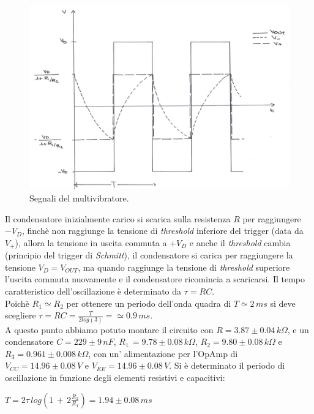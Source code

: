 \documentclass[10pt,a4paper]{article}
\begin{document}
\begin{figure}[htb!]
\centering
\includegraphics[scale=.5]{immagini/ondeSovrapposte.jpg}
\caption{Segnali del multivibratore.}
\label{funzionamento}
\end{figure}

Il condensatore inizialmente carico si scarica sulla resistenza $R$ per raggiungere $-V_D$, finchè non raggiunge la tensione di \emph{threshold} inferiore del trigger (data da $V_{+}$), allora la tensione in uscita commuta a $+V_{D}$ e anche il \emph{threshold} cambia (principio del trigger di \emph{Schmitt}), il condensatore si carica per raggiungere la tensione $V_D = V_{OUT}$, ma quando raggiunge la tensione di \emph{threshold} superiore l'uscita commuta nuovamente e il condensatore ricomincia a scaricarsi. Il tempo caratteristico dell'oscillazione è determinato da $\tau = RC$.\\


Poichè $R_1 \simeq R_2$ per ottenere un periodo dell'onda quadra di $T \simeq 2 \, ms$ si deve scegliere $\tau = RC = \frac{T}{2 log(3)} = \simeq 0.9\,ms$.\\
A questo punto abbiamo potuto montare il circuito con $R = 3.87 \pm 0.04 \, k\Omega$, e un condensatore $C = 229 \pm 9 \, nF$, $R_1\,= 9.78\pm0.08 \, k\Omega $, $R_2 = 9.80\pm0.08\, k\Omega $ e $R_3 = 0.961\pm0.008 \, k\Omega $, con un' alimentazione per l'OpAmp di $V_{CC} = 14.96\pm0.08 \, V$ e $V_{EE} = 14.96 \pm 0.08 \, V$.
Si è determinato il periodo di oscillazione in funzione degli elementi resistivi e capacitivi: 
\begin{center}
$T=2\tau\, log\left( 1\,+\,2\frac{R_2}{R_1}\right) = 1.94 \pm 0.08 \, ms$ 
\end{center}
\end{document}

